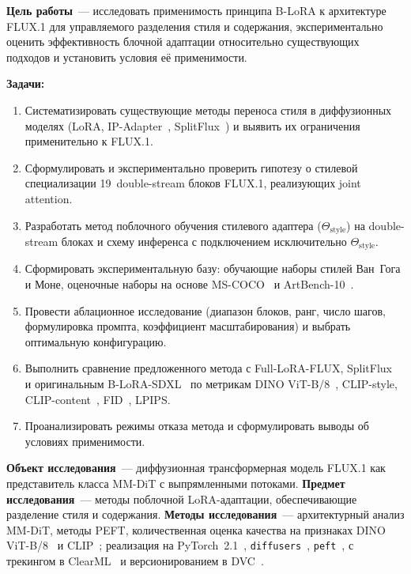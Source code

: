 \textbf{Цель работы}~--- исследовать применимость принципа B-LoRA к архитектуре FLUX.1 для управляемого разделения стиля и содержания, экспериментально оценить эффективность блочной адаптации относительно существующих подходов и установить условия её применимости.

\textbf{Задачи:}
\begin{enumerate}\itemsep0.2em
    \item Систематизировать существующие методы переноса стиля в диффузионных моделях (LoRA, IP-Adapter~\cite{ye2023ipadapter}, SplitFlux~\cite{yang2025splitflux}) и выявить их ограничения применительно к FLUX.1.
    \item Сформулировать и экспериментально проверить гипотезу о стилевой специализации 19~double-stream блоков FLUX.1, реализующих joint attention.
    \item Разработать метод поблочного обучения стилевого адаптера ($\Theta_\text{style}$) на double-stream блоках и схему инференса с подключением исключительно $\Theta_\text{style}$.
    \item Сформировать экспериментальную базу: обучающие наборы стилей Ван~Гога и Моне, оценочные наборы на основе MS-COCO~\cite{lin2014coco} и ArtBench-10~\cite{liao2022artbench}.
    \item Провести аблационное исследование (диапазон блоков, ранг, число шагов, формулировка промпта, коэффициент масштабирования) и выбрать оптимальную конфигурацию.
    \item Выполнить сравнение предложенного метода с Full-LoRA-FLUX, SplitFlux~\cite{yang2025splitflux} и оригинальным B-LoRA-SDXL~\cite{frenkel2024blora} по метрикам DINO ViT-B/8~\cite{caron2021dino}, CLIP-style, CLIP-content~\cite{radford2021clip}, FID~\cite{heusel2017fid}, LPIPS.
    \item Проанализировать режимы отказа метода и сформулировать выводы об условиях применимости.
\end{enumerate}

\textbf{Объект исследования}~--- диффузионная трансформерная модель FLUX.1 как представитель класса MM-DiT с выпрямленными потоками. \textbf{Предмет исследования}~--- методы поблочной LoRA-адаптации, обеспечивающие разделение стиля и содержания. \textbf{Методы исследования}~--- архитектурный анализ MM-DiT, методы PEFT, количественная оценка качества на признаках DINO ViT-B/8~\cite{caron2021dino} и CLIP~\cite{radford2021clip}; реализация на PyTorch~2.1~\cite{paszke2019pytorch}, \texttt{diffusers}~\cite{von2022diffusers}, \texttt{peft}~\cite{peft2022}, с трекингом в ClearML~\cite{clearml2024} и версионированием в DVC~\cite{dvc2020}.

